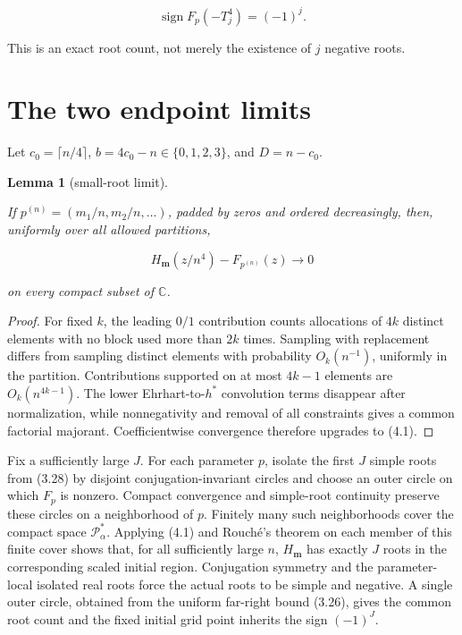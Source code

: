 \documentclass[11pt]{article}
\newtheorem{lemma}[theorem]{Lemma}
\begin{document}
\[
\operatorname{sign}F_p(-T_j^4)=(-1)^j. \tag{3.28}
\]

This is an exact root count, not merely the existence of $j$ negative roots.

\section{The two endpoint limits}


Let $c_0=\lceil n/4\rceil$, $b=4c_0-n\in\{0,1,2,3\}$, and
$D=n-c_0$.

\Needspace{0.16\textheight}
\begin{lemma}[small-root limit]
\label{lemma:4-1}

If $p^{(n)}=(m_1/n,m_2/n,\ldots)$, padded by zeros and ordered decreasingly,
then, uniformly over all allowed partitions,

\[
H_{\mathbf m}(z/n^4)-F_{p^{(n)}}(z)\longrightarrow0 \tag{4.1}
\]

on every compact subset of $\mathbb C$.

\end{lemma}

\begin{proof}


For fixed $k$, the leading $0/1$ contribution counts allocations of $4k$
distinct elements with no block used more than $2k$ times.  Sampling with
replacement differs from sampling distinct elements with probability
$O_k(n^{-1})$, uniformly in the partition.  Contributions supported on at most
$4k-1$ elements are $O_k(n^{4k-1})$.  The lower Ehrhart-to-$h^*$
convolution terms disappear after normalization, while nonnegativity and removal of
all constraints gives a common factorial majorant.  Coefficientwise convergence
therefore upgrades to (4.1).
\end{proof}


Fix a sufficiently large $J$.  For each parameter $p$, isolate the first
$J$ simple roots from (3.28) by disjoint conjugation-invariant circles and
choose an outer circle on which $F_p$ is nonzero.  Compact convergence and
simple-root continuity preserve these circles on a neighborhood of $p$.
Finitely many such neighborhoods cover the compact space
$\mathcal P_\alpha^*$.  Applying (4.1) and Rouché's theorem on each member of
this finite cover shows that, for all sufficiently large $n$,
$H_{\mathbf m}$ has exactly $J$ roots in the corresponding scaled initial
region.  Conjugation symmetry and the parameter-local isolated real roots force
the actual roots to be simple and negative.  A single outer circle, obtained
from the uniform far-right bound (3.26), gives the common root count and the
fixed initial grid point inherits the sign $(-1)^J$.
\end{document}
